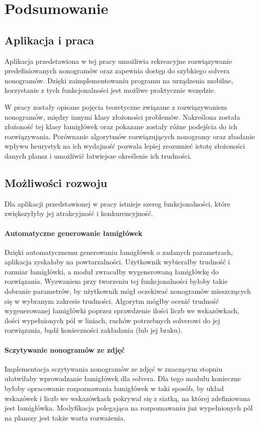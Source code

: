 \chapter{Podsumowanie}
\thispagestyle{chapterBeginStyle}



\section{Aplikacja i praca}
    Aplikacja przedstawiona w tej pracy umożliwia rekreacyjne rozwiązywanie predefiniowanych
nonogramów oraz zapewnia dostęp do szybkiego solvera nonogramów. Dzięki zaimplementowaniu programu
na urządzenia mobilne, korzystanie z tych funkcjonalności jest możliwe praktycznie wszędzie.

    W pracy zostały opisane pojęcia teoretyczne związane z rozwiązywaniem nonogramów, 
między innymi klasy złożoności problemów. Nakreślona została złożoność tej klasy łamigłówek 
oraz pokazane zostały różne podejścia do ich rozwiązywania. Porównanie algorytmów rozwiązujących
nonogramy oraz zbadanie wpływu heurystyk na ich wydajność pozwala lepiej zrozumieć istotę
złożoności danych plansz i umożliwić łatwiejsze określenie ich trudności.



\section{Możliwości rozwoju}
    Dla aplikacji przedstawionej w pracy istnieje szereg funkcjonalności, które zwiększyłyby jej
atrakcyjność i konkurencyjność.

\subsubsection{Automatyczne generowanie łamigłówek}
    Dzięki automatycznemu generowaniu łamigłówek o zadanych parametrach, aplikacja zyskałaby
na powtarzalności. Użytkownik wybierałby trudność i rozmiar łamigłówki, a moduł zwracałby
wygenerowaną łamigłówkę do rozwiązania. Wyzwaniem przy tworzeniu tej funkcjonalności byłoby takie
dobranie parametrów, by użytkownik mógł oczekiwać nonogramów mieszczących się w wybranym zakresie
trudności. Algorytm mógłby ocenić trudność wygenerowanej łamigłówki poprzez sprawdzenie ilości liczb
we wskazówkach, ilości wypełnionych pól w liniach, ruchów potrzebnych solverowi do jej rozwiązania,
bądź konieczności zakładania (lub jej braku).

\subsubsection{Sczytywanie nonogramów ze zdjęć}
    Implementacja sczytywania nonogramów ze zdjęć w znaczącym stopniu ułatwiłaby wprowadzanie
łamigłówek dla solvera. Dla tego modułu konieczne byłoby opracowanie rozpoznawania łamigłówek w taki
sposób, by układ wskazówek i liczb we wskazówkach pokrywał się z siatką, na której zdefiniowana jest
łamigłówka. Modyfikacja polegająca na rozpoznawaniu już wypełnionych pól na planszy jest
także warta rozważenia.

